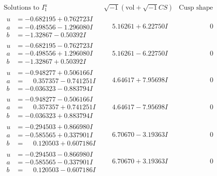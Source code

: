 \documentclass[1p]{elsarticle_modified}
\theoremstyle{definition}
\newcommand{\I}{\sqrt{-1}}
\begin{document}
$$\begin{array}{c|c|c}  
\text{Solutions to }I^u_{1}& \I (\text{vol} + \sqrt{-1}CS) & \text{Cusp shape}\\
 \hline 
\begin{aligned}
u &= -0.682195 + 0.762723 I \\
a &= -0.498556 - 1.296080 I \\
b &= -1.32867 - 0.50392 I\end{aligned}
 & \phantom{-}5.16261 + 6.22750 I & \phantom{-0.000000 } 0 \\ \hline\begin{aligned}
u &= -0.682195 - 0.762723 I \\
a &= -0.498556 + 1.296080 I \\
b &= -1.32867 + 0.50392 I\end{aligned}
 & \phantom{-}5.16261 - 6.22750 I & \phantom{-0.000000 } 0 \\ \hline\begin{aligned}
u &= -0.948277 + 0.506166 I \\
a &= \phantom{-}0.357357 - 0.741251 I \\
b &= -0.036323 - 0.883794 I\end{aligned}
 & \phantom{-}4.64617 + 7.95698 I & \phantom{-0.000000 } 0 \\ \hline\begin{aligned}
u &= -0.948277 - 0.506166 I \\
a &= \phantom{-}0.357357 + 0.741251 I \\
b &= -0.036323 + 0.883794 I\end{aligned}
 & \phantom{-}4.64617 - 7.95698 I & \phantom{-0.000000 } 0 \\ \hline\begin{aligned}
u &= -0.294503 + 0.866980 I \\
a &= -0.585565 + 0.337901 I \\
b &= \phantom{-}0.120503 + 0.607186 I\end{aligned}
 & \phantom{-}6.70670 - 3.19363 I & \phantom{-0.000000 } 0 \\ \hline\begin{aligned}
u &= -0.294503 - 0.866980 I \\
a &= -0.585565 - 0.337901 I \\
b &= \phantom{-}0.120503 - 0.607186 I\end{aligned}
 & \phantom{-}6.70670 + 3.19363 I & \phantom{-0.000000 } 0 \\ \hline\begin{aligned}

\end{aligned}
\end{array}$$
\end{document}
